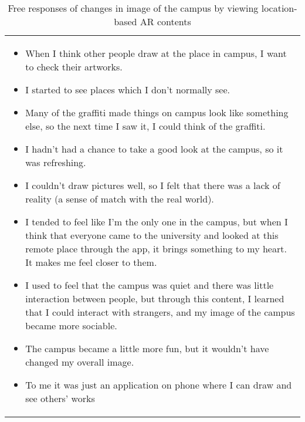 \begin{table}[h]
\begin{center}
    \caption{Free responses of changes in image of the campus by viewing location-based AR contents}\label{table:9}
    \begin{tabular}{L{\textwidth}}
        \hline
           \\
        \hline
          {
            \begin{itemize}
              \item When I think other people draw at the place in campus, I want to check their artworks.
              \item I started to see places which I don't normally see.
              \item Many of the graffiti made things on campus look like something else, so the next time I saw it, I could think of the graffiti.
              \item I hadn't had a chance to take a good look at the campus, so it was refreshing.
              \item I couldn't draw pictures well, so I felt that there was a lack of reality (a sense of match with the real world).
              \item I tended to feel like I'm the only one in the campus, but when I think that everyone came to the university and looked at this remote place through the app, it brings something to my heart. It makes me feel closer to them.
              \item I used to feel that the campus was quiet and there was little interaction between people, but through this content, I learned that I could interact with strangers, and my image of the campus became more sociable.
              \item The campus became a little more fun, but it wouldn't have changed my overall image.
              \item To me it was just an application on phone where I can draw and see others' works
            \end{itemize}
          } \\
        \hline
    \end{tabular}
\end{center} 
\end{table}

